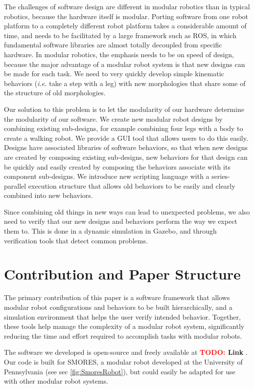 \documentclass[conference]{IEEEtran}
\theoremstyle{definition}
\newcommand{\TODO}[1]{ {\bf \textcolor{red}{TODO:} #1 }}
\begin{document}
The challenges of software design are different in modular robotics than
in typical robotics, because the hardware itself is modular. Porting software
from one robot platform to a completely different robot platform takes a
considerable amount of time, and needs to be facilitated by a large framework
such as ROS, in which fundamental software libraries are almost totally decoupled from
specific hardware. In modular robotics, the emphasis needs to be on speed of
design, because the major advantage of a modular robot system is that new
designs can be made for each task. We need to  very quickly develop simple kinematic
behaviors (\textit{i.e.} take a step with a leg) with new morphologies that share some of the
structure of old morphologies.

Our solution to this problem is to let the modularity of our hardware determine the
modularity of our software. We create new modular robot designs by combining existing sub-designs,
for example combining four legs with a body to create a walking robot.
We provide a GUI tool that allows users to do this easily. Designs have
associated libraries of software behaviors, so that when new designs are created
by composing existing sub-designs, new behaviors for that design can be quickly
and easily created by composing the behaviors associate with its component
sub-designs. We introduce new scripting language with a series-parallel
execution structure that allows old behaviors to be easily and clearly combined
into new behaviors.

Since combining old things in new ways can lead to unexpected problems, we also
need to verify that our new designs and behaviors perform the way we expect them
to. This is done in a dynamic simulation in Gazebo, and through
verification tools that detect common problems.


\section{Contribution and Paper Structure}

The primary contribution of this paper is a software framework that allows modular
robot configurations and behaviors to be built hierarchically, and a simulation
environment that helps the user verify intended behavior.  Together, these tools
help manage the complexity of a modular robot system, significantly reducing the
time and effort required to accomplish tasks with modular robots.

The software we developed is open-source and freely available at\TODO{Link}.  Our
code is built for SMORES,  a modular robot developed at the University of
Pennsylvania (see sec \ref{fig:SmoresRobot}), but could easily be adapted for use with
other modular robot systems.
\end{document}

